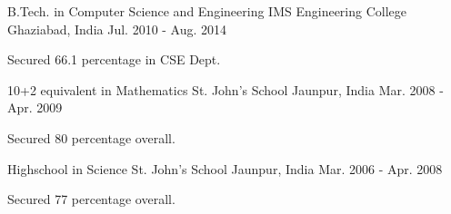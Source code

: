 

\begin{cventries}

  \cventry
    {B.Tech. in Computer Science and Engineering} %
    {IMS Engineering College} %
    {Ghaziabad, India} %
    {Jul. 2010 - Aug. 2014} %
    {
      \begin{cvitems} %
        \item {Secured 66.1 percentage in CSE Dept.}
      \end{cvitems}
    }

\cventry
{10+2 equivalent in Mathematics} %
{St. John's School} %
{Jaunpur, India} %
{Mar. 2008 - Apr. 2009} %
{
	\begin{cvitems} %
		\item {Secured 80 percentage overall.}
	\end{cvitems}
}

\cventry
{Highschool in Science} %
{St. John's School} %
{Jaunpur, India} %
{Mar. 2006 - Apr. 2008} %
{
	\begin{cvitems} %
		\item {Secured 77 percentage overall.}
	\end{cvitems}
}

\end{cventries}
